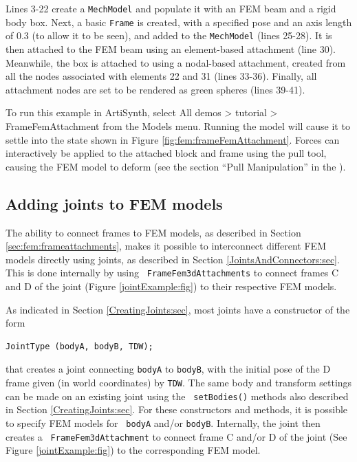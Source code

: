 \lstset{numbers=none} 
Lines 3-22 create a {\tt MechModel} and populate it with an FEM beam
and a rigid body box. Next, a basic {\tt Frame} is created, with a
specified pose and an axis length of 0.3 (to allow it to be seen), and
added to the {\tt MechModel} (lines 25-28). It is then attached to the
FEM beam using an element-based attachment (line 30).  Meanwhile, the
box is attached to using a nodal-based attachment, created from all
the nodes associated with elements 22 and 31 (lines 33-36). Finally,
all attachment nodes are set to be rendered as green spheres (lines
39-41).

To run this example in ArtiSynth, select {\sf All demos > tutorial >
FrameFemAttachment} from the {\sf Models} menu. Running the model will
cause it to settle into the state shown in Figure
\ref{fig:fem:frameFemAttachment}. Forces can interactively
be applied to the attached block and frame using the
pull tool, causing the FEM model to deform 
(see the section ``Pull Manipulation'' in the
).

\subsection{Adding joints to FEM models}
\label{FEMJoints:sec}

The ability to connect frames to FEM models, as described in Section
\ref{sec:fem:frameattachments}, makes it possible to interconnect
different FEM models directly using joints, as described in Section
\ref{JointsAndConnectors:sec}. This is done internally by using {\tt
FrameFem3dAttachments} to connect frames C and D of the joint (Figure
\ref{jointExample:fig}) to their respective FEM models.

As indicated in Section \ref{CreatingJoints:sec}, most
joints have a constructor of the form
%
\begin{lstlisting}[]
  JointType (bodyA, bodyB, TDW);
\end{lstlisting}
%
that creates a joint connecting {\tt bodyA} to {\tt bodyB}, with the initial
pose of the D frame given (in world coordinates) by {\tt TDW}.  The same body
and transform settings can be made on an existing joint using the {\tt
setBodies()} methods also described in Section \ref{CreatingJoints:sec}.  For
these constructors and methods, it is possible to specify FEM models for {\tt
bodyA} and/or {\tt bodyB}. Internally, the joint then creates a {\tt
FrameFem3dAttachment} to connect frame C and/or D of the joint (See
Figure \ref{jointExample:fig}) to the corresponding FEM model.

